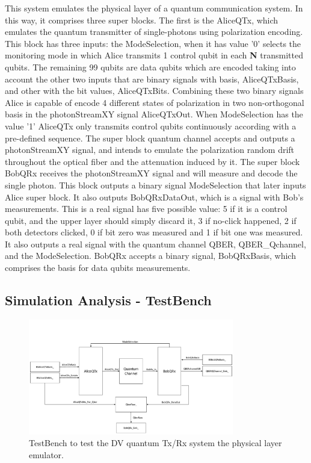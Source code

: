 \begin{refsection}
This system emulates the physical layer of a quantum communication system. In this way, it comprises three super blocks. The first is the AliceQTx, which emulates the quantum transmitter of single-photons using polarization encoding. This block has three inputs: the ModeSelection, when it has value '0' selects the monitoring mode in which Alice transmits 1 control qubit in each \textbf{N} transmitted qubits. The remaining 99 qubits are data qubits which are encoded taking into account the other two inputs that are binary signals with basis, AliceQTxBasis, and other with the bit values, AliceQTxBits. Combining these two binary signals Alice is capable of encode 4 different states of polarization in two non-orthogonal basis in the photonStreamXY signal AliceQTxOut. When ModeSelection has the value '1' AliceQTx only transmits control qubits continuously according with a pre-defined sequence.
The super block quantum channel accepts and outputs a photonStreamXY signal, and intends to emulate the polarization random drift throughout the optical fiber and the attenuation induced by it. The super block BobQRx receives the photonStreamXY signal and will measure and decode the single photon. This block outputs a binary signal ModeSelection that later inputs Alice super block. It also outputs BobQRxDataOut, which is a signal with Bob's measurements. This is a real signal has five possible value: 5 if it is a control qubit, and the upper layer should simply discard it, 3 if no-click happened, 2 if both detectors clicked, 0 if bit zero was measured and 1 if bit one was measured. It also outputs a real signal with the quantum channel QBER, QBER\_Qchannel, and the ModeSelection. BobQRx accepts a binary signal, BobQRxBasis, which comprises the basis for data qubits measurements.

\subsection{Simulation Analysis - TestBench}

\begin{figure}[h]
    \centering
        \includegraphics[clip, trim=0.1cm 0.1cm 0.1cm 2cm, width=0.80\textwidth]{./sdf/DvQuantumTxRx/figures/TesteBench.pdf}
    \caption{TestBench to test the DV quantum Tx/Rx system the physical layer emulator.}\label{testbench}
\end{figure}


\end{refsection}
